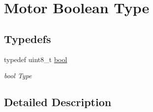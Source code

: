 \hypertarget{group___motor___boolean___type}{}\section{Motor Boolean Type}
\label{group___motor___boolean___type}
\subsection*{Typedefs}
\begin{DoxyCompactItemize}
\item 
\mbox{\label{group___motor___boolean___type_ga0ecf26b576b9a54eca656b9be7ba6a06}} 
typedef uint8\+\_\+t \mbox{\hyperlink{group___motor___boolean___type_ga0ecf26b576b9a54eca656b9be7ba6a06}{bool}}
\begin{DoxyCompactList}\small\item\em bool Type \end{DoxyCompactList}\end{DoxyCompactItemize}


\subsection{Detailed Description}
